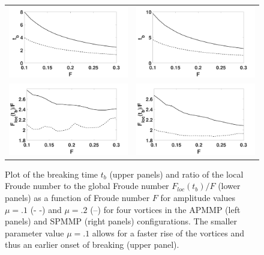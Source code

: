 \documentclass[a4paper,11pt]{article}
\begin{document}
\begin{figure}[!h]
\centering
\begin{tabular}{cc}
\includegraphics[width=.5\textwidth]{froude_comp_pmmp} & \includegraphics[width=.5\textwidth]{froude_comp_pmmp_sym}\\
\includegraphics[width=.5\textwidth]{froude_loc_pmmp} & \includegraphics[width=.5\textwidth]{froude_loc_pmmp_sym}
\end{tabular}
\caption{Plot of the breaking time $t_{b}$ (upper panels) and ratio of the local Froude number to the global Froude number $F_{loc}(t_{b})/F$ (lower panels) as a function of Froude number $F$ for amplitude values $\mu=.1$ (- -) and $\mu=.2$ (--) for four vortices in the APMMP (left panels) and SPMMP (right panels) configurations.  The smaller parameter value $\mu=.1$ allows for a faster rise of the vortices and thus an earlier onset of breaking (upper panel).}
\label{fig:froudecomp_pmmp}
\end{figure}
\end{document}
